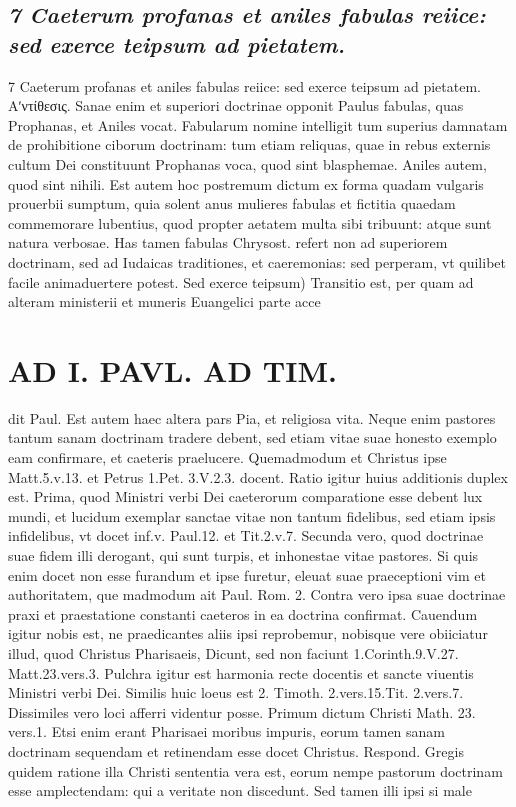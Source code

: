 \documentclass{article}
\begin{document}
\begin{pages}
\subsection*{\textit{7 Caeterum profanas et aniles fabulas reiice: sed exerce teipsum ad pietatem.}}7 Caeterum profanas et aniles fabulas reiice: sed exerce teipsum ad pietatem. Αʹντίθεσις. Sanae enim et superiori doctrinae opponit Paulus fabulas, quas Prophanas, et Aniles vocat. Fabularum nomine intelligit tum superius damnatam de prohibitione ciborum doctrinam: tum etiam reliquas, quae in rebus externis cultum Dei constituunt Prophanas voca, quod sint blasphemae. Aniles autem, quod sint nihili. Est autem hoc postremum dictum ex forma quadam vulgaris prouerbii sumptum, quia solent anus mulieres fabulas et fictitia quaedam commemorare lubentius, quod propter aetatem multa sibi tribuunt: atque sunt natura verbosae. Has tamen fabulas Chrysost. refert non ad superiorem doctrinam, sed ad Iudaicas traditiones, et caeremonias: sed perperam, vt quilibet facile animaduertere potest. Sed exerce teipsum) Transitio est, per quam ad alteram ministerii et muneris Euangelici parte acce  \pend
\section*{AD I. PAVL. AD TIM. }
\marginpar{[ p.204 ]}\pstart dit Paul. Est autem haec altera pars Pia, et religiosa vita. Neque enim pastores tantum sanam doctrinam tradere debent, sed etiam vitae suae honesto exemplo eam confirmare, et caeteris praelucere. Quemadmodum et Christus ipse Matt.5.v.13. et Petrus 1.Pet. 3.V.2.3. docent. Ratio igitur huius additionis duplex est. Prima, quod Ministri verbi Dei caeterorum comparatione esse debent lux mundi, et lucidum exemplar sanctae vitae non tantum fidelibus, sed etiam ipsis infidelibus, vt docet inf.v. Paul.12. et Tit.2.v.7. Secunda vero, quod doctrinae suae fidem illi derogant, qui sunt turpis, et inhonestae vitae pastores. Si quis enim docet non esse furandum et ipse furetur, eleuat suae praeceptioni vim et authoritatem, que madmodum ait Paul. Rom. 2. Contra vero ipsa suae doctrinae praxi et praestatione constanti caeteros in ea doctrina confirmat. Cauendum igitur nobis est, ne praedicantes aliis ipsi reprobemur, nobisque vere obiiciatur illud, quod Christus Pharisaeis, Dicunt, sed non faciunt 1.Corinth.9.V.27. Matt.23.vers.3. Pulchra igitur est harmonia recte docentis et sancte viuentis Ministri verbi Dei. Similis huic loeus est 2. Timoth. 2.vers.15.Tit. 2.vers.7. Dissimiles vero loci afferri videntur posse. Primum dictum Christi Math. 23. vers.1. Etsi enim erant Pharisaei moribus impuris, eorum tamen sanam doctrinam sequendam et retinendam esse docet Christus. Respond. Gregis quidem ratione illa Christi sententia vera est, eorum nempe pastorum doctrinam esse amplectendam: qui a veritate non discedunt. Sed tamen illi ipsi si male  \pend

\end{pages}
\end{document}
